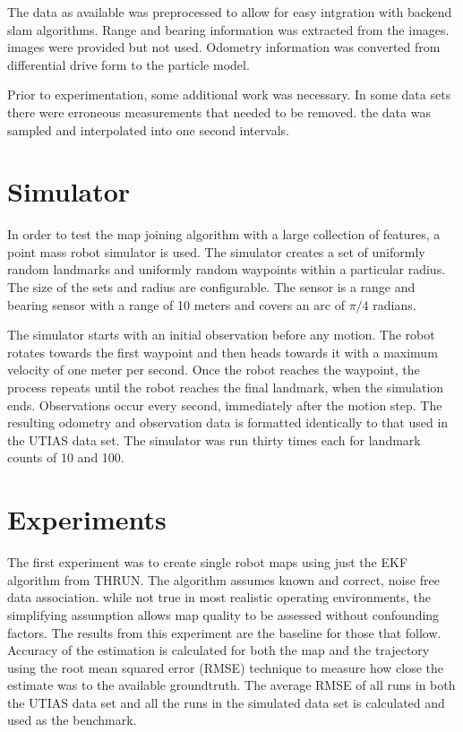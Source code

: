 \documentclass[12pt]{report}
\begin{document}
The data as available was preprocessed to allow for easy intgration with backend slam algorithms.  Range and bearing information was extracted from the images.   images were provided but not used.  Odometry information was converted from differential drive form to the particle model.

Prior to experimentation, some additional work was necessary.  In some data sets there were erroneous measurements that needed to be removed.  the data was sampled and interpolated into one second intervals.    


\section{Simulator}
In order to test the map joining algorithm with a large collection of features, a point mass robot simulator is used.  The simulator creates a set of uniformly random landmarks and uniformly random waypoints within a particular radius.  The size of the sets and radius are configurable.  The sensor is a range and bearing sensor with a range of 10 meters and covers an arc of $\pi/4$ radians.  

The simulator starts with an initial observation before any motion.  The robot rotates towards the first waypoint and then heads towards it with a maximum velocity of one meter per second.  Once the robot reaches the waypoint, the process repeats until the robot reaches the final landmark, when the simulation ends.  Observations occur every second, immediately after the motion step.  The resulting odometry and observation data is formatted identically to that used in the UTIAS data set.  The simulator was run thirty times each for landmark counts of 10 and 100.

\section{Experiments}
The first experiment was to create single robot maps using just the EKF algorithm from THRUN.  The algorithm assumes known and correct, noise free data association.  while not true in most realistic operating environments, the simplifying assumption allows map quality to be assessed without confounding factors.  The results from this experiment are the baseline for those that follow. Accuracy of the estimation is calculated for both the map and the trajectory using the root mean squared error (RMSE) technique to measure how close the estimate was to the available groundtruth.  The average RMSE of all runs in both the UTIAS data set and all the runs in the simulated data set is calculated and used as the benchmark.  
\end{document}
